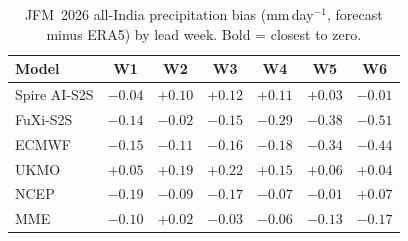 \begin{table}[t]
  \centering
  \caption{JFM~2026 all-India precipitation bias (mm\,day$^{-1}$, forecast minus ERA5) by lead week. Bold = closest to zero.}
  \label{tab:bias_tp}
  \small
  \begin{tabular}{lcccccc}
    \toprule
    Model & W1 & W2 & W3 & W4 & W5 & W6 \\
    \midrule
    Spire AI-S2S   & $\mathbf{-0.04}$ & $+0.10$ & $\mathbf{+0.12}$ & $+0.11$ & $+0.03$ & $\mathbf{-0.01}$ \\
FuXi-S2S       & $-0.14$ & $\mathbf{-0.02}$ & $-0.15$ & $-0.29$ & $-0.38$ & $-0.51$ \\
ECMWF          & $-0.15$ & $-0.11$ & $-0.16$ & $-0.18$ & $-0.34$ & $-0.44$ \\
UKMO           & $+0.05$ & $+0.19$ & $+0.22$ & $+0.15$ & $+0.06$ & $+0.04$ \\
NCEP           & $-0.19$ & $-0.09$ & $-0.17$ & $\mathbf{-0.07}$ & $\mathbf{-0.01}$ & $+0.07$ \\
MME            & $-0.10$ & $+0.02$ & $-0.03$ & $-0.06$ & $-0.13$ & $-0.17$ \\
    \bottomrule
  \end{tabular}
\end{table}
